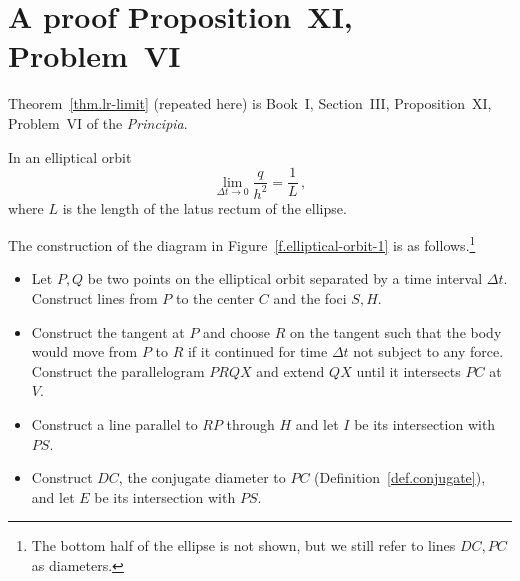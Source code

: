 

\chapter{A proof Proposition~XI, Problem~VI}
\label{s.centripetal}


Theorem~\ref{thm.lr-limit} (repeated here) is Book~I, Section~III, Proposition~XI, Problem~VI of the \emph{Principia}.
\begin{theorem}
In an elliptical orbit
\[
\lim_{\Delta t \rightarrow 0} \frac{q}{h^2} = \frac{1}{L}\,,
\]
where $L$ is the length of the latus rectum of the ellipse.
\end{theorem}

The construction of the diagram in Figure~\ref{f.elliptical-orbit-1} is as follows.\footnote{The bottom half of the ellipse is not shown, but we still refer to lines $DC,PC$ as diameters.}
\begin{itemize}
\item Let $P,Q$ be two points on the elliptical orbit separated by a time interval $\Delta t$. Construct lines from $P$ to the center $C$ and the foci $S,H$.

\item Construct the tangent at $P$ and choose $R$ on the tangent such that the body would move from $P$ to $R$ if it continued for time $\Delta t$ not subject to any force. Construct the parallelogram $PRQX$ and extend $QX$ until it intersects $PC$ at $V$.

\item Construct a line parallel to $RP$ through $H$ and let $I$ be its intersection with $PS$. 

\item Construct $DC$, the conjugate diameter to $PC$ (Definition~\ref{def.conjugate}), and let $E$ be its intersection with $PS$.
\end{itemize}


